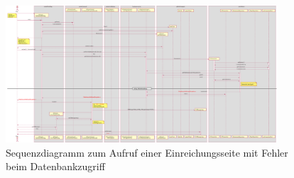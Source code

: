 \begin{figure}[H]
    \centering
    \includegraphics[width=0.9\textwidth]{graphics/upload_revision_failure}
    \caption{Sequenzdiagramm zum Aufruf einer Einreichungsseite mit Fehler beim Datenbankzugriff}
    \label{fig:upload-revision-sequence-failure}
\end{figure}
